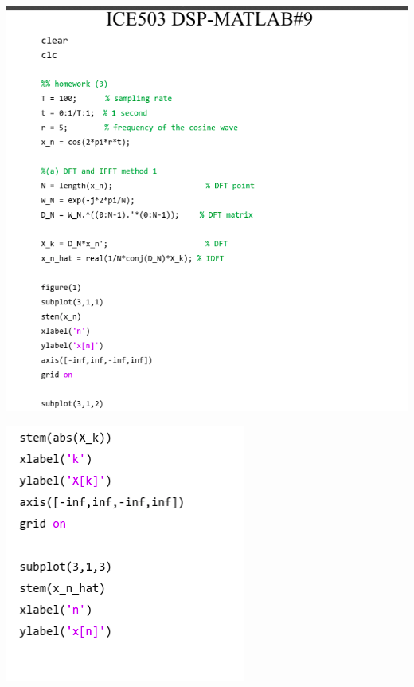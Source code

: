 \documentclass[a4paper]{article}
\begin{document}
	
	\begin{center}
		\includegraphics[width=1\linewidth]{screenshot095}
	\end{center}
	
	\begin{center}
		\includegraphics[width=1\linewidth]{screenshot096}
	\end{center}
	
\end{document}
